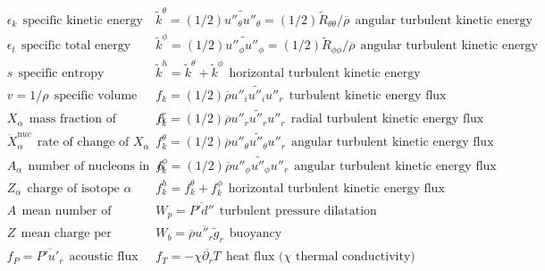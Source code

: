 \documentclass[10pt,paper=a4]{report}
\newcommand{\eht}{\overline}
\newcommand{\fht}{\widetilde}
\begin{document}
\begin{table*}
\begin{align}
& \epsilon_k \ \ \mbox{specific kinetic energy}                      & & \fht{k}^\theta = (1/2)\fht{u''_\theta u''_\theta} = (1/2)\fht{R}_{\theta \theta}/\eht{\rho} \ \ \mbox{angular turbulent kinetic energy}  \nonumber \\
& \epsilon_t \ \ \mbox{specific total energy}                        & & \fht{k}^\phi = (1/2)\fht{u''_\phi u''_\phi} = (1/2) \fht{R}_{\phi \phi}/\eht{\rho} \ \ \mbox{angular turbulent kinetic energy} \nonumber \\ 
& s \ \ \mbox{specific entropy}                                      & & \fht{k}^h = \fht{k}^\theta + \fht{k}^\phi \ \ \mbox{horizontal turbulent kinetic energy}                                    \nonumber \\
& v = 1/\rho \ \ \mbox{specific volume}                               & & f_k = (1/2)\eht{\rho} \fht{u''_i u''_i u''_r} \ \ \mbox{turbulent kinetic energy flux}                                    \nonumber \\    
& X_\alpha \ \ \mbox{mass fraction of isotope $\alpha$}               & & f_k^r = (1/2)\eht{\rho} \fht{u''_r u''_r u''_r} \ \ \mbox{radial turbulent kinetic energy flux}                          \nonumber \\
& \dot{X}_\alpha^{\mathrm nuc} \ \ \mbox{rate of change of $X_\alpha$}     & & f_k^\theta = (1/2)\eht{\rho} \fht{u''_\theta u''_\theta u''_r} \ \ \mbox{angular turbulent kinetic energy flux}              \nonumber \\    
& A_\alpha \ \ \mbox{number of nucleons in isotope $\alpha$}           & & f_k^\phi = (1/2)\eht{\rho} \fht{u''_\phi u''_\phi u''_r} \ \ \mbox{angular turbulent kinetic energy flux}                   \nonumber \\ 
& Z_\alpha \ \ \mbox{charge of isotope $\alpha$}                     & & f_k^h = f_k^\theta + f_k^\phi \ \ \mbox{horizontal turbulent kinetic energy flux}                                           \nonumber \\   
& A \ \ \mbox{mean number of nucleons per isotope}          & & W_p = \eht{P'd''} \ \ \mbox{turbulent pressure dilatation}      \nonumber \\                                            
& Z \ \ \mbox{mean charge per isotope}                     & &   W_b = \eht{\rho} \eht{u''_r} \fht{g}_r \ \ \mbox{buoyancy}          \nonumber  \\
& f_P = \eht{P' u'_r} \ \ \mbox{acoustic flux}                                    & &  f_T = -\eht{\chi \partial_r T} \ \ \mbox{heat flux ($\chi$ thermal conductivity})             \nonumber 
\end{align} 
\end{table*}
\end{document}
